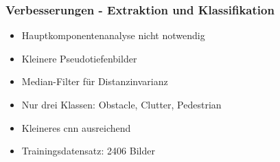 \begin{frame}
    \frametitle{Verbesserungen - Extraktion und Klassifikation}
    \begin{itemize}
        \item Hauptkomponentenanalyse nicht notwendig
            \pause
        \item Kleinere Pseudotiefenbilder
            \pause
        \item Median-Filter für Distanzinvarianz
            \pause
        \item Nur drei Klassen: Obstacle, Clutter, Pedestrian
            \pause
        \item Kleineres \ac{cnn} ausreichend
            \pause
        \item Trainingsdatensatz: 2406 Bilder
    \end{itemize}
\end{frame}

